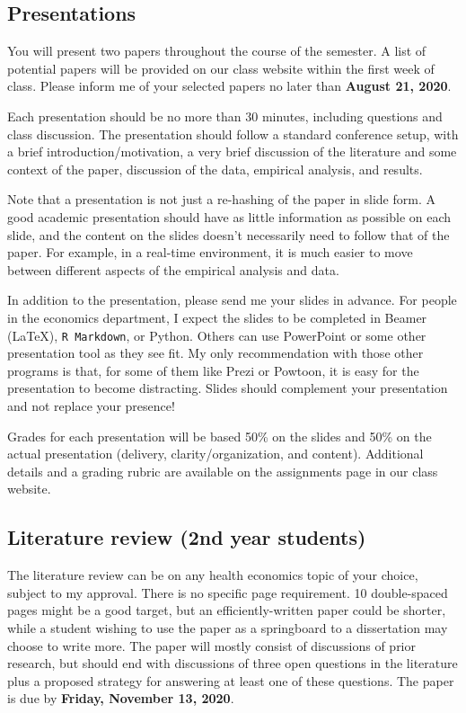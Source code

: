 \documentclass[11pt,]{article}
\begin{document}
\hypertarget{presentations}{%
\subsection{Presentations}\label{presentations}}

You will present two papers throughout the course of the semester. A
list of potential papers will be provided on our class website within
the first week of class. Please inform me of your selected papers no
later than \textbf{August 21, 2020}.

Each presentation should be no more than 30 minutes, including questions
and class discussion. The presentation should follow a standard
conference setup, with a brief introduction/motivation, a very brief
discussion of the literature and some context of the paper, discussion
of the data, empirical analysis, and results.

Note that a presentation is not just a re-hashing of the paper in slide
form. A good academic presentation should have as little information as
possible on each slide, and the content on the slides doesn't
necessarily need to follow that of the paper. For example, in a
real-time environment, it is much easier to move between different
aspects of the empirical analysis and data.

In addition to the presentation, please send me your slides in advance.
For people in the economics department, I expect the slides to be
completed in Beamer (LaTeX), \texttt{R\ Markdown}, or Python. Others can
use PowerPoint or some other presentation tool as they see fit. My only
recommendation with those other programs is that, for some of them like
Prezi or Powtoon, it is easy for the presentation to become distracting.
Slides should complement your presentation and not replace your
presence!

Grades for each presentation will be based 50\% on the slides and 50\%
on the actual presentation (delivery, clarity/organization, and
content). Additional details and a grading rubric are available on the
assignments page in our class website.

\hypertarget{literature-review-2nd-year-students}{%
\subsection{Literature review (2nd year
students)}\label{literature-review-2nd-year-students}}

The literature review can be on any health economics topic of your
choice, subject to my approval. There is no specific page requirement.
10 double-spaced pages might be a good target, but an
efficiently-written paper could be shorter, while a student wishing to
use the paper as a springboard to a dissertation may choose to write
more. The paper will mostly consist of discussions of prior research,
but should end with discussions of three open questions in the
literature plus a proposed strategy for answering at least one of these
questions. The paper is due by \textbf{Friday, November 13, 2020}.
\end{document}
